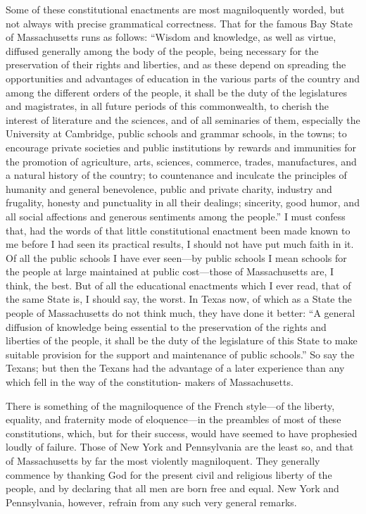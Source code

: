Some of these constitutional enactments are most magniloquently
worded, but not always with precise grammatical correctness.  That
for the famous Bay State of Massachusetts runs as follows: ``Wisdom
and knowledge, as well as virtue, diffused generally among the body
of the people, being necessary for the preservation of their rights
and liberties, and as these depend on spreading the opportunities
and advantages of education in the various parts of the country and
among the different orders of the people, it shall be the duty of
the legislatures and magistrates, in all future periods of this
commonwealth, to cherish the interest of literature and the
sciences, and of all seminaries of them, especially the University
at Cambridge, public schools and grammar schools, in the towns; to
encourage private societies and public institutions by rewards and
immunities for the promotion of agriculture, arts, sciences,
commerce, trades, manufactures, and a natural history of the
country; to countenance and inculcate the principles of humanity
and general benevolence, public and private charity, industry and
frugality, honesty and punctuality in all their dealings;
sincerity, good humor, and all social affections and generous
sentiments among the people.''  I must confess that, had the words
of that little constitutional enactment been made known to me
before I had seen its practical results, I should not have put much
faith in it.  Of all the public schools I have ever seen---by public
schools I mean schools for the people at large maintained at public
cost---those of Massachusetts are, I think, the best.  But of all
the educational enactments which I ever read, that of the same
State is, I should say, the worst.  In Texas now, of which as a
State the people of Massachusetts do not think much, they have done
it better: ``A general diffusion of knowledge being essential to the
preservation of the rights and liberties of the people, it shall be
the duty of the legislature of this State to make suitable
provision for the support and maintenance of public schools.''  So
say the Texans; but then the Texans had the advantage of a later
experience than any which fell in the way of the constitution-
makers of Massachusetts.

There is something of the magniloquence of the French style---of the
liberty, equality, and fraternity mode of eloquence---in the
preambles of most of these constitutions, which, but for their
success, would have seemed to have prophesied loudly of failure.
Those of New York and Pennsylvania are the least so, and that of
Massachusetts by far the most violently magniloquent.  They
generally commence by thanking God for the present civil and
religious liberty of the people, and by declaring that all men are
born free and equal.  New York and Pennsylvania, however, refrain
from any such very general remarks.

